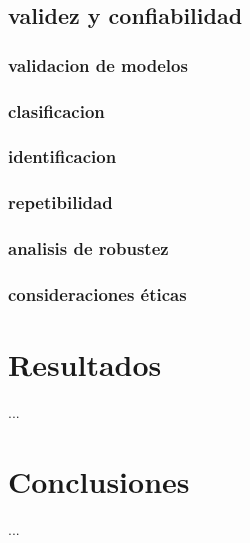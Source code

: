 \documentclass[12pt,letterpaper,oneside,openright]{book}
\begin{document}
\section{validez y confiabilidad}
\subsection{validacion de modelos}
\subsection{clasificacion}
\subsection{identificacion}
\subsection{repetibilidad}
\subsection{analisis de robustez}
\subsection{consideraciones éticas}

\chapter{Resultados}

...

\chapter{Conclusiones}

...


 
\end{document}
